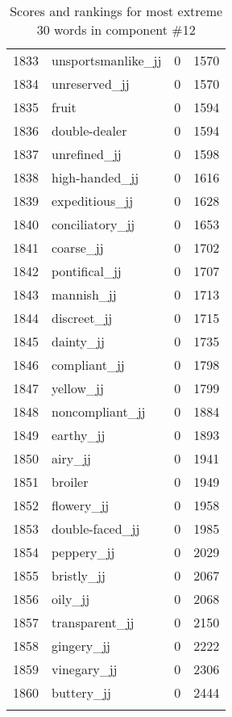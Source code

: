 \begin{longtable}[!htbp]{| rlr@{.}l |}
    1833 & unsportsmanlike\_jj & 0 & 1570 \\
    1834 & unreserved\_jj & 0 & 1570 \\
    1835 & fruit & 0 & 1594 \\
    1836 & double-dealer & 0 & 1594 \\
    1837 & unrefined\_jj & 0 & 1598 \\
    1838 & high-handed\_jj & 0 & 1616 \\
    1839 & expeditious\_jj & 0 & 1628 \\
    1840 & conciliatory\_jj & 0 & 1653 \\
    1841 & coarse\_jj & 0 & 1702 \\
    1842 & pontifical\_jj & 0 & 1707 \\
    1843 & mannish\_jj & 0 & 1713 \\
    1844 & discreet\_jj & 0 & 1715 \\
    1845 & dainty\_jj & 0 & 1735 \\
    1846 & compliant\_jj & 0 & 1798 \\
    1847 & yellow\_jj & 0 & 1799 \\
    1848 & noncompliant\_jj & 0 & 1884 \\
    1849 & earthy\_jj & 0 & 1893 \\
    1850 & airy\_jj & 0 & 1941 \\
    1851 & broiler & 0 & 1949 \\
    1852 & flowery\_jj & 0 & 1958 \\
    1853 & double-faced\_jj & 0 & 1985 \\
    1854 & peppery\_jj & 0 & 2029 \\
    1855 & bristly\_jj & 0 & 2067 \\
    1856 & oily\_jj & 0 & 2068 \\
    1857 & transparent\_jj & 0 & 2150 \\
    1858 & gingery\_jj & 0 & 2222 \\
    1859 & vinegary\_jj & 0 & 2306 \\
    1860 & buttery\_jj & 0 & 2444 \\
    \hline
    \caption{Scores and rankings for most extreme 30 words in component \#12} \\
\end{longtable}
